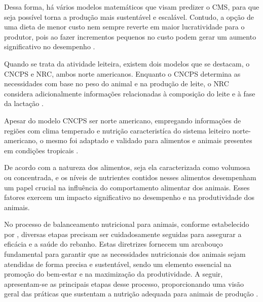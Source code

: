 Dessa forma, há vários modelos matemáticos que visam predizer o \gls{CMS}, para que seja possível torna a produção mais sustentável e escalável. Contudo, a opção de uma dieta de menor custo nem sempre reverte em maior lucratividade para o produtor, pois ao fazer incrementos pequenos no custo podem gerar um aumento significativo no desempenho \cite{Kolln:2014:AvaliacaoSistemaOtimizacaoRacaoVacaLeiteira}.

Quando se trata da atividade leiteira, existem dois modelos que se destacam, o \gls{CNCPS} e \gls{NRC}, ambos norte americanos. Enquanto o \gls{CNCPS} determina as necessidades com base no peso do animal e na produção de leite, o \gls{NRC} considera adicionalmente informações relacionadas à composição do leite e à fase da lactação \cite{Zanin:2017:EquacoesEstimarConsumoVacasLeiteiras}.

Apesar do modelo \gls{CNCPS} ser norte americano, empregando informações de regiões com clima temperado e nutrição caracteristíca do sistema leiteiro norte-americano, o mesmo foi adaptado e validado para alimentos e animais presentes em condições tropicais \cite{Lanna:1999:ModelosLinearesNaoLinearesUsoNutrientes}.

De acordo com  a natureza dos alimentos, seja ela caracterizada como volumosa ou concentrada, e os níveis de nutrientes contidos nesses alimentos desempenham um papel crucial na influência do comportamento alimentar dos animais. Esses fatores exercem um impacto significativo no desempenho e na produtividade dos animais.

No processo de balanceamento nutricional para animais, conforme estabelecido por , diversas etapas precisam ser cuidadosamente seguidas para assegurar a eficácia e a saúde do rebanho. Estas diretrizes fornecem um arcabouço fundamental para garantir que as necessidades nutricionais dos animais sejam atendidas de forma precisa e sustentável, sendo um elemento essencial na promoção do bem-estar e na maximização da produtividade. A seguir, apresentam-se as principais etapas desse processo, proporcionando uma visão geral das práticas que sustentam a nutrição adequada para animais de produção \cite{Salman:2011:ManualFormulacaoRacaoVacasLeiteiras}.

